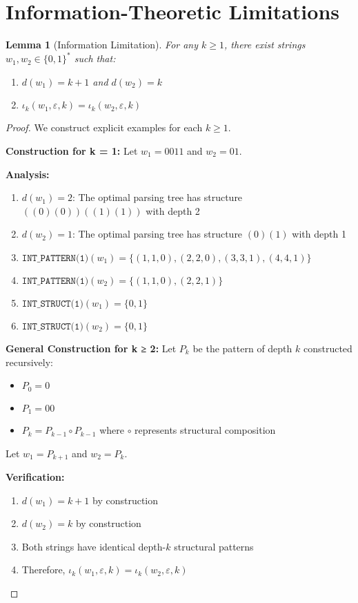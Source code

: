 \documentclass[11pt]{article}
\newtheorem{lemma}{Lemma}
\begin{document}
\section{Information-Theoretic Limitations}

\begin{lemma}[Information Limitation]
For any $k \geq 1$, there exist strings $w_1, w_2 \in \{0,1\}^*$ such that:
\begin{enumerate}
\item $d(w_1) = k+1$ and $d(w_2) = k$
\item $\iota_k(w_1, \varepsilon, k) = \iota_k(w_2, \varepsilon, k)$
\end{enumerate}
\end{lemma}

\begin{proof}
We construct explicit examples for each $k \geq 1$.

\textbf{Construction for k = 1:}
Let $w_1 = 0011$ and $w_2 = 01$.

\textbf{Analysis:}
\begin{enumerate}
\item $d(w_1) = 2$: The optimal parsing tree has structure $((0)(0))((1)(1))$ with depth 2
\item $d(w_2) = 1$: The optimal parsing tree has structure $(0)(1)$ with depth 1
\item $\texttt{INT\_PATTERN(1)}(w_1) = \{(1,1,0), (2,2,0), (3,3,1), (4,4,1)\}$
\item $\texttt{INT\_PATTERN(1)}(w_2) = \{(1,1,0), (2,2,1)\}$
\item $\texttt{INT\_STRUCT(1)}(w_1) = \{0,1\}$
\item $\texttt{INT\_STRUCT(1)}(w_2) = \{0,1\}$
\end{enumerate}

\textbf{General Construction for k ≥ 2:}
Let $P_k$ be the pattern of depth $k$ constructed recursively:
\begin{itemize}
\item $P_0 = 0$
\item $P_1 = 00$
\item $P_k = P_{k-1} \circ P_{k-1}$ where $\circ$ represents structural composition
\end{itemize}

Let $w_1 = P_{k+1}$ and $w_2 = P_k$.

\textbf{Verification:}
\begin{enumerate}
\item $d(w_1) = k+1$ by construction
\item $d(w_2) = k$ by construction
\item Both strings have identical depth-$k$ structural patterns
\item Therefore, $\iota_k(w_1, \varepsilon, k) = \iota_k(w_2, \varepsilon, k)$
\end{enumerate}
\end{proof}
\end{document}
